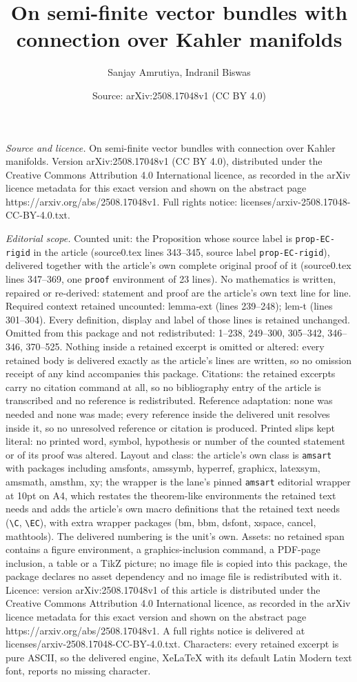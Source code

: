 \documentclass[10pt,a4paper]{amsart}
\title[On semi-finite vector bundles with connection over Kahler ma]{On semi-finite vector bundles with connection over Kahler manifolds}
\author{Sanjay Amrutiya, Indranil Biswas}
\date{Source: arXiv:2508.17048v1 (CC BY 4.0)}
\begin{document}
\maketitle

\noindent\emph{Source and licence.} On semi-finite vector bundles with connection over Kahler manifolds. Version arXiv:2508.17048v1 (CC BY 4.0), distributed under the Creative Commons Attribution 4.0 International licence, as recorded in the arXiv licence metadata for this exact version and shown on the abstract page https://arxiv.org/abs/2508.17048v1. Full rights notice: licenses/arxiv-2508.17048-CC-BY-4.0.txt.\par\smallskip

\noindent\textit{Editorial scope.} Counted unit: the Proposition whose source label is \texttt{prop-EC-rigid} in the article (source0.tex lines 343--345, source label \texttt{prop-EC-rigid}), delivered together with the article's own complete original proof of it (source0.tex lines 347--369, one \texttt{proof} environment of 23 lines). No mathematics is written, repaired or re-derived: statement and proof are the article's own text line for line. Required context retained uncounted: lemma-ext (lines 239--248); lem-t (lines 301--304). Every definition, display and label of those lines is retained unchanged. Omitted from this package and not redistributed: 1--238, 249--300, 305--342, 346--346, 370--525. Nothing inside a retained excerpt is omitted or altered: every retained body is delivered exactly as the article's lines are written, so no omission receipt of any kind accompanies this package. Citations: the retained excerpts carry no citation command at all, so no bibliography entry of the article is transcribed and no reference is redistributed. Reference adaptation: none was needed and none was made; every reference inside the delivered unit resolves inside it, so no unresolved reference or citation is produced. Printed slips kept literal: no printed word, symbol, hypothesis or number of the counted statement or of its proof was altered. Layout and class: the article's own class is \texttt{amsart} with packages including amsfonts, amssymb, hyperref, graphicx, latexsym, amsmath, amsthm, xy; the wrapper is the lane's pinned \texttt{amsart} editorial wrapper at 10pt on A4, which restates the theorem-like environments the retained text needs and adds the article's own macro definitions that the retained text needs (\texttt{\textbackslash C}, \texttt{\textbackslash EC}), with extra wrapper packages (bm, bbm, dsfont, xspace, cancel, mathtools). The delivered numbering is the unit's own. Assets: no retained span contains a figure environment, a graphics-inclusion command, a PDF-page inclusion, a table or a TikZ picture; no image file is copied into this package, the package declares no asset dependency and no image file is redistributed with it. Licence: version arXiv:2508.17048v1 of this article is distributed under the Creative Commons Attribution 4.0 International licence, as recorded in the arXiv licence metadata for this exact version and shown on the abstract page https://arxiv.org/abs/2508.17048v1. A full rights notice is delivered at licenses/arxiv-2508.17048-CC-BY-4.0.txt. Characters: every retained excerpt is pure ASCII, so the delivered engine, XeLaTeX with its default Latin Modern text font, reports no missing character.
\end{document}
